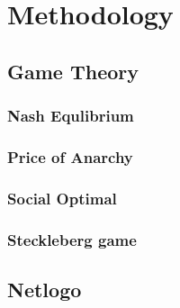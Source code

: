 \chapter{Methodology}

\section{Game Theory}
\subsection{Nash Equlibrium}
\subsection{Price of Anarchy}
\subsection{Social Optimal}
\subsection{Steckleberg game}

\section{Netlogo}
